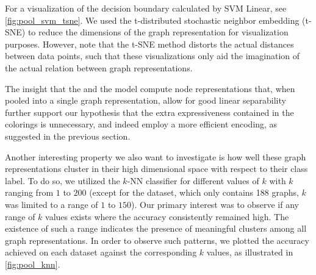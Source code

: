 For a visualization of the decision boundary calculated by \textsf{SVM Linear}, see \cref{fig:pool_svm_tsne}. We used the \textsf{t-distributed stochastic neighbor embedding (t-SNE)} to reduce the dimensions of the graph representation for visualization purposes. However, note that the \textsf{t-SNE} method distorts the actual distances between data points, such that these visualizations only aid the imagination of the actual relation between graph representations. 

The insight that the \gnn and the \wlnn model compute node representations that, when pooled into a single graph representation, allow for good linear separability further support our  hypothesis that the extra expressiveness contained in the \wl colorings is unnecessary, and \gnns indeed employ a more efficient encoding, as suggested in the previous section.

Another interesting property we also want to investigate is how well these graph representations cluster in their high dimensional space with respect to their class label. To do so, we utilized the \textsf{$k$-NN} classifier for different values of $k$ with $k$ ranging from $1$ to $200$ (except for the \mutag dataset, which only contains 188 graphs, $k$ was limited to a range of $1$ to $150$). Our primary interest was to observe if any range of $k$ values exists where the accuracy consistently remained high. The existence of such a range indicates the presence of meaningful clusters among all graph representations. In order to observe such patterns, we plotted the accuracy achieved on each dataset against the corresponding $k$ values, as illustrated in \cref{fig:pool_knn}.

